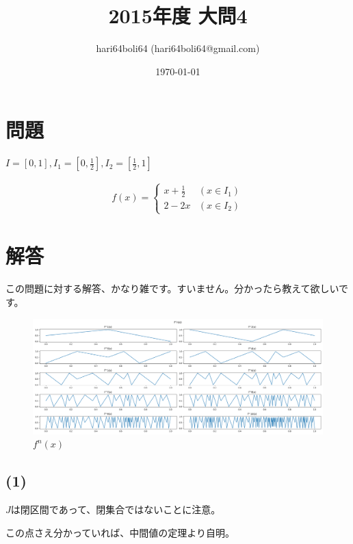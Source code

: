 \documentclass[a4paper, 10pt, dvipdfmx]{jlreq}
\begin{document}
\title{2015年度 大問4}
\author{hari64boli64 (hari64boli64@gmail.com)}
\date{\today}
\maketitle

\section{問題}

$I=[0,1],I_1=[0,\frac{1}{2}],I_2=[\frac{1}{2},1]$

\begin{align*}
  f(x)=\begin{cases}
         x+\frac{1}{2} & (x\in I_1)  \\
         2-2x          & (x \in I_2)
       \end{cases}
\end{align*}

\section{解答}

この問題に対する解答、かなり雑です。すいません。分かったら教えて欲しいです。

\begin{figure}[htbp]
  \begin{center}
    \includegraphics[width=140mm]{4.png}
    \caption{$f^n(x)$}
    \label{img:fnx}
  \end{center}
\end{figure}

\subsection*{(1)}

$J$は閉区間であって、閉集合ではないことに注意。

この点さえ分かっていれば、中間値の定理より自明。
\end{document}
